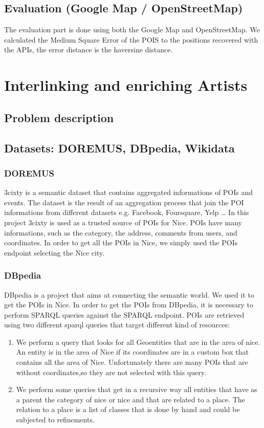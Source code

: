 \subsection{Evaluation (Google Map / OpenStreetMap)}
The evaluation part is done using both the Google Map and OpenStreetMap. We calculated the Medium Square Error of the POIS to the positions recovered with the APIs, the error distance is the haversine distance.
\section{Interlinking and enriching Artists}
\subsection{Problem description}
\subsection{Datasets: DOREMUS, DBpedia, Wikidata}
\subsubsection{DOREMUS}
3cixty is a semantic dataset that contains aggregated informations of POIs and events. The dataset is the result of an aggregation process that join the POI informations from different datasets e.g. Facebook, Foursquare, Yelp \dots
In this project 3cixty is used as a trusted source of POIs for Nice.
POIs have many informations, such as the category, the address, comments from users, and coordinates. In order to get all the POIs in Nice, we simply used the POIs endpoint selecting the Nice city.
\subsubsection{DBpedia}
DBpedia is a project that aims at connecting the semantic world. We used it to get the POIs in Nice.
In order to get the POIs from DBpedia, it is necessary to perform SPARQL queries against the SPARQL endpoint. POIs are retrieved using two different sparql queries that target different kind of resources:
\begin{enumerate}
\item We perform a query that looks for all Geoentities that are in the area of nice. An entity is in the area of Nice if its coordinates are in a custom box that contains all the area of Nice.
Unfortunately there are many POIs that are without coordinates,so they are not selected with this query.
\item We perform some queries that get in a recursive way all entities that have as a parent the category of nice or nice and that are related to a place. The relation to a place is a list of classes that is done by hand and could be subjected to refinements.
\end{enumerate}
